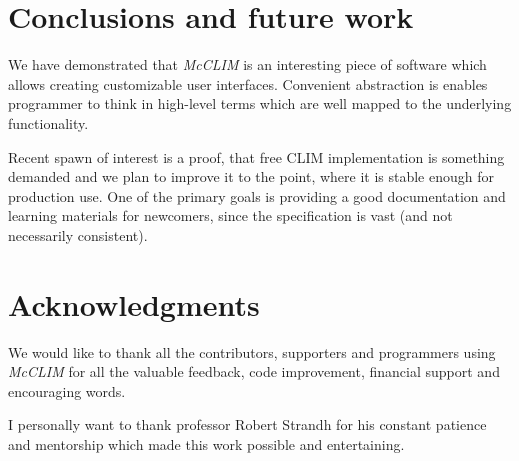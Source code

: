 \documentclass{sig-alternate-05-2015}
\begin{document}
\section{Conclusions and future work}

We have demonstrated that \emph{McCLIM} is an interesting piece of
software which allows creating customizable user
interfaces. Convenient abstraction is enables programmer to think in
high-level terms which are well mapped to the underlying
functionality.

Recent spawn of interest is a proof, that free CLIM implementation is
something demanded and we plan to improve it to the point, where it is
stable enough for production use. One of the primary goals is
providing a good documentation and learning materials for newcomers,
since the specification is vast (and not necessarily consistent).

\section{Acknowledgments} 

We would like to thank all the contributors, supporters and
programmers using \emph{McCLIM} for all the valuable feedback, code
improvement, financial support and encouraging words.

I personally want to thank professor Robert Strandh for his constant
patience and mentorship which made this work possible and
entertaining.



\end{document}
